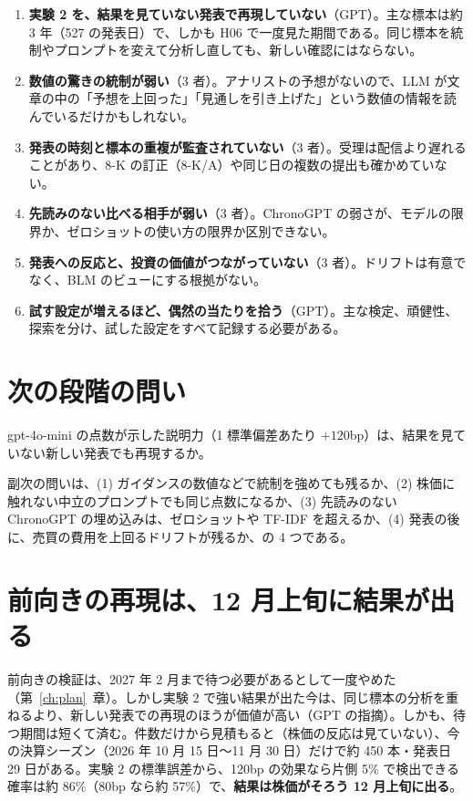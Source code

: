 \documentclass[xelatex,ja=standard,jafont=haranoaji,a4paper,10pt]{bxjsreport}
\newcommand{\chapref}[1]{第~\ref{#1}~章}
\begin{document}
\begin{enumerate}
\item \textbf{実験 2 を、結果を見ていない発表で再現していない}（GPT）。主な標本は約 3 年（527 の発表日）で、しかも H06 で一度見た期間である。同じ標本を統制やプロンプトを変えて分析し直しても、新しい確認にはならない。
\item \textbf{数値の驚きの統制が弱い}（3 者）。アナリストの予想がないので、LLM が文章の中の「予想を上回った」「見通しを引き上げた」という数値の情報を読んでいるだけかもしれない。
\item \textbf{発表の時刻と標本の重複が監査されていない}（3 者）。受理は配信より遅れることがあり、8-K の訂正（8-K/A）や同じ日の複数の提出も確かめていない。
\item \textbf{先読みのない比べる相手が弱い}（3 者）。ChronoGPT の弱さが、モデルの限界か、ゼロショットの使い方の限界か区別できない。
\item \textbf{発表への反応と、投資の価値がつながっていない}（3 者）。ドリフトは有意でなく、BLM のビューにする根拠がない。
\item \textbf{試す設定が増えるほど、偶然の当たりを拾う}（GPT）。主な検定、頑健性、探索を分け、試した設定をすべて記録する必要がある。
\end{enumerate}

\section{次の段階の問い}

\begin{verdict}[主な問い]
gpt-4o-mini の点数が示した説明力（1 標準偏差あたり $+120$bp）は、結果を見ていない新しい発表でも再現するか。
\end{verdict}

副次の問いは、(1) ガイダンスの数値などで統制を強めても残るか、(2) 株価に触れない中立のプロンプトでも同じ点数になるか、(3) 先読みのない ChronoGPT の埋め込みは、ゼロショットや TF-IDF を超えるか、(4) 発表の後に、売買の費用を上回るドリフトが残るか、の 4 つである。

\section{前向きの再現は、12 月上旬に結果が出る}

前向きの検証は、2027 年 2 月まで待つ必要があるとして一度やめた（\chapref{ch:plan}）。しかし実験 2 で強い結果が出た今は、同じ標本の分析を重ねるより、新しい発表での再現のほうが価値が高い（GPT の指摘）。しかも、待つ期間は短くて済む。件数だけから見積もると（株価の反応は見ていない）、今の決算シーズン（2026 年 10 月 15 日〜11 月 30 日）だけで約 450 本・発表日 29 日がある。実験 2 の標準誤差から、120bp の効果なら片側 5\% で検出できる確率は約 86\%（80bp なら約 57\%）で、\textbf{結果は株価がそろう 12 月上旬に出る}。
\end{document}
